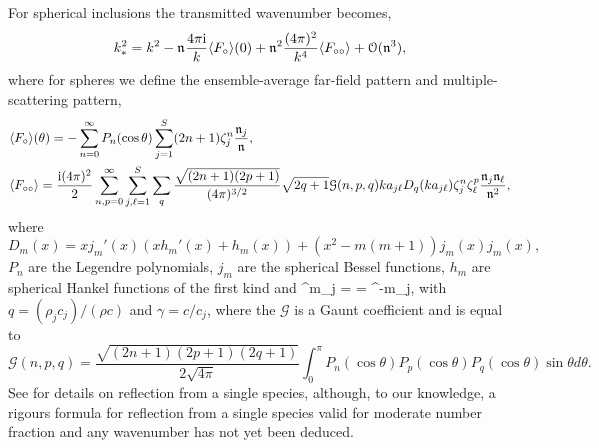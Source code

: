 \documentclass[12pt, a4paper]{article}
\begin{document}
For spherical inclusions the transmitted wavenumber becomes,
\begin{align}
   k_*^2 = k^2 -\mathfrak n_{} \frac{4 \pi \textrm{i}}{k}  \langle F_\circ \rangle(0) + \mathfrak n_{}^2 \frac{(4 \pi)^2 }{k^4} \langle F_{\circ\circ} \rangle
   + \mathcal O(\mathfrak n_{}^3),
  \label{eqn:SmallNfracSpheres}
\end{align}
where for spheres we define the ensemble-average far-field pattern and multiple-scattering pattern,
\begin{align}
  &\langle F_\circ \rangle(\theta) = - \sum_{n=0}^\infty P_n (\cos \theta ) \sum_{j=1}^S (2n+1)  \zeta^n_j \frac{\mathfrak n_{j}}{\mathfrak n_{}},
\\
  &\langle F_{\circ\circ} \rangle = \frac{\textrm{i} (4 \pi)^2}{2} \sum_{n,p=0}^\infty \sum_{j,\ell=1}^S \sum_q  \frac{\sqrt{(2n+1)(2p+1)}}{(4 \pi)^{3/2}}  \sqrt{2 q +1} \mathcal G(n,p,q) k a_{j\ell} D_q(k a_{j\ell}) \zeta^n_j \zeta^p_\ell \frac{\mathfrak n_{j} \mathfrak n_{\ell}}{\mathfrak n_{}^2},
\notag
\end{align}
where
\[
D_m(x) = x j_m'(x)( x h_m'(x) + h_m(x)) + (x^2 - m(m+1))j_m(x) j_m(x),
\]
$P_n$ are the Legendre polynomials, $j_m$ are the spherical Bessel functions, $h_m$ are spherical Hankel functions of the first kind  and
\be
\scatZs^m_j =  = \scatZs^{-m}_j,
\label{eqn:Zm}
\en
with $q = (\rho_j c_j)/(\rho c)$ and $\gamma = c/c_j$, where the $\mathcal G$ is a Gaunt coefficient and is equal to
\[
\mathcal G(n,p,q) = \frac{\sqrt{(2n+1)(2p+1)(2q+1)}}{2 \sqrt{4 \pi}}   \int_0^\pi  P_n(\cos \theta) P_p(\cos \theta) P_q(\cos \theta) \sin \theta d \theta.
\]
See \cite{caleap_effective_2012} for details on reflection from a single species, although, to our knowledge, a rigours formula for reflection from a single species valid for moderate number fraction and any wavenumber has not yet been deduced.

\printbibliography

% 
% 
\end{document}

